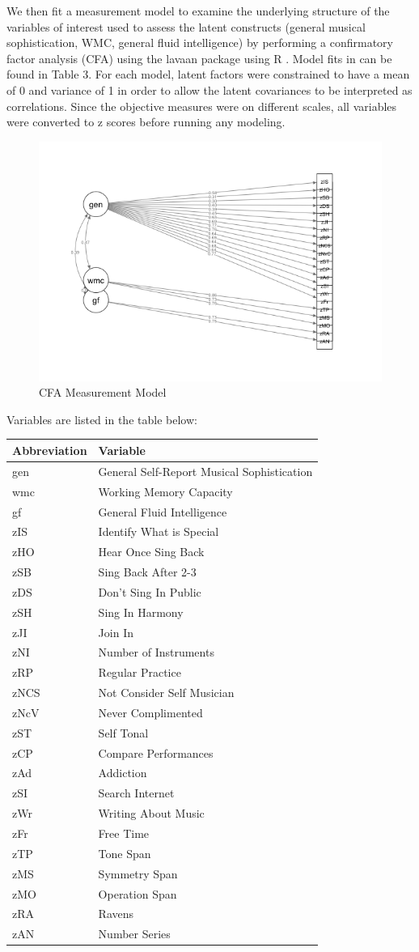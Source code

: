 \documentclass[]{book}
\begin{document}
We then fit a measurement model to examine the underlying structure of the variables of interest used to assess the latent constructs (general musical sophistication, WMC, general fluid intelligence) by performing a confirmatory factor analysis (CFA) using the lavaan package \citep{rosseelLavaanPackageStructural2012} using R \citep{teamLanguageEnvironmentStatistical2015}.
Model fits in can be found in Table 3.
For each model, latent factors were constrained to have a mean of 0 and variance of 1 in order to allow the latent covariances to be interpreted as correlations.
Since the objective measures were on different scales, all variables were converted to z scores before running any modeling.

\begin{figure}

{\centering \includegraphics[width=1\linewidth]{img/measurementModel} 

}

\caption{CFA Measurement Model}\label{fig:measurementmodel}
\end{figure}

Variables are listed in the table below:

\begin{longtable}[]{@{}ll@{}}
\toprule
Abbreviation & Variable\tabularnewline
\midrule
\endhead
gen & General Self-Report Musical Sophistication\tabularnewline
wmc & Working Memory Capacity\tabularnewline
gf & General Fluid Intelligence\tabularnewline
zIS & Identify What is Special\tabularnewline
zHO & Hear Once Sing Back\tabularnewline
zSB & Sing Back After 2-3\tabularnewline
zDS & Don't Sing In Public\tabularnewline
zSH & Sing In Harmony\tabularnewline
zJI & Join In\tabularnewline
zNI & Number of Instruments\tabularnewline
zRP & Regular Practice\tabularnewline
zNCS & Not Consider Self Musician\tabularnewline
zNcV & Never Complimented\tabularnewline
zST & Self Tonal\tabularnewline
zCP & Compare Performances\tabularnewline
zAd & Addiction\tabularnewline
zSI & Search Internet\tabularnewline
zWr & Writing About Music\tabularnewline
zFr & Free Time\tabularnewline
zTP & Tone Span\tabularnewline
zMS & Symmetry Span\tabularnewline
zMO & Operation Span\tabularnewline
zRA & Ravens\tabularnewline
zAN & Number Series\tabularnewline
\bottomrule
\end{longtable}
\end{document}
